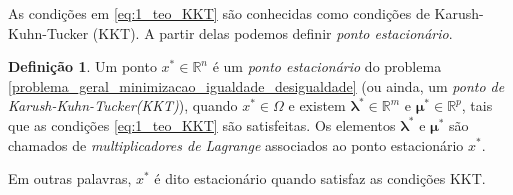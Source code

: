 \documentclass[12pt,a4paper]{scrartcl}
\def\RR{\mathds{R}}
\theoremstyle{definition}%
\newtheorem{defi}{Definição}
\begin{document}
As condições em \eqref{eq:1_teo_KKT} são conhecidas como condições de Karush-Kuhn-Tucker (KKT). A partir delas podemos definir \emph{ponto estacionário}.

\begin{defi} 
Um ponto $x^{*} \in \RR^{n} $ é um \emph{ponto estacionário} do problema \eqref{problema_geral_minimizacao_igualdade_desigualdade} (ou ainda, um \emph{ponto de Karush-Kuhn-Tucker(KKT)}), quando $x^{*} \in \Omega$ e existem $\boldsymbol{\lambda}^{*} \in \RR^{m}$ e $\boldsymbol{\mu}^{*} \in \RR^{p}$, tais que as condições \eqref{eq:1_teo_KKT} são satisfeitas. Os elementos $\boldsymbol{\lambda}^{*}$ e $\boldsymbol{\mu}^{*}$ são chamados de \emph{multiplicadores de Lagrange} associados ao ponto estacionário $x^{*}$.
\end{defi}
Em outras palavras, $x^{*}$ é dito estacionário quando satisfaz as condições KKT. 



\end{document}
